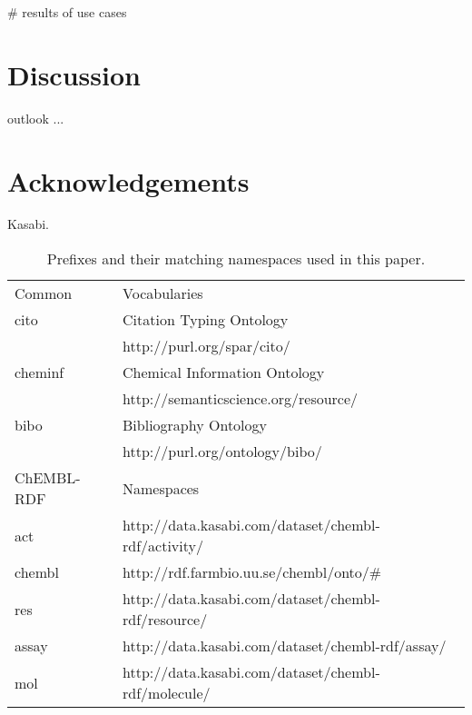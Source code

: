 \documentclass[sw]{iosart2c}
\begin{document}
\# results of use cases

\section{Discussion}

outlook ...

\section{Acknowledgements}

Kasabi.


\begin{table*}
\caption{Prefixes and their matching namespaces used in this paper.} \label{namespaces}
\begin{tabular}{ll}
\hline
Common & Vocabularies \\
cito    & Citation Typing Ontology~\cite{Shotton2010} \\
        & http://purl.org/spar/cito/ \\
cheminf & Chemical Information Ontology~\cite{Hastings2011} \\
        & http://semanticscience.org/resource/ \\
bibo    & Bibliography Ontology~\cite{Giasson2011} \\
        & http://purl.org/ontology/bibo/ \\

\hline
ChEMBL-RDF & Namespaces\\
act    & http://data.kasabi.com/dataset/chembl-rdf/activity/ \\
chembl & http://rdf.farmbio.uu.se/chembl/onto/\# \\
res    & http://data.kasabi.com/dataset/chembl-rdf/resource/ \\
assay  & http://data.kasabi.com/dataset/chembl-rdf/assay/ \\
mol    & http://data.kasabi.com/dataset/chembl-rdf/molecule/ \\
\hline
\end{tabular}
\end{table*}



%
%
%

\end{document}
